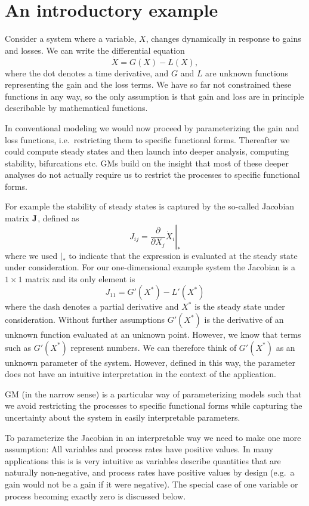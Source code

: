 \documentclass{article}
\newcommand{\eq}[1]{\begin{equation}#1\end{equation}}
\begin{document}

\section{An introductory example}
Consider a system where a variable, $X$, changes dynamically in response to gains and losses. We can write the differential equation 
\eq{
\label{eqGMex}
\dot{X}=G(X)-L(X),
}
where the dot denotes a time derivative, and $G$ and $L$ are unknown functions representing the gain and the loss terms. We have so far not constrained these functions in any way, so the only assumption is that gain and loss are in principle describable by mathematical functions. 

In conventional modeling we would now proceed by parameterizing the gain and loss functions, i.e.~restricting them to specific functional forms. Thereafter we could compute steady states and then launch into deeper analysis, computing stability, bifurcations etc. GMs build on the insight that most of these deeper analyses do not actually require us to restrict the processes to specific functional forms. 

For example the stability of steady states is captured by the so-called Jacobian matrix $\bf J$, defined as 
\eq{
    J_{ij} = \left.\frac{\partial}{\partial X_j} \dot{X}_i \right|_*
}
where we used $|_*$ to indicate that the expression is evaluated at the steady state under consideration. For our one-dimensional example system the Jacobian is a $1\times 1$ matrix and its only element is 
\eq{
J_{11} = G'(X^*)-L'(X^*)
}
where the dash denotes a partial derivative and $X^*$ is the steady state under consideration. Without further assumptions $G'(X^*)$ is the derivative of an unknown function evaluated at an unknown point. However, we know that terms such as $G'(X^*)$ represent numbers. We can therefore think of $G'(X^*)$ as an unknown parameter of the system. However, defined in this way, the parameter does not have an intuitive interpretation in the context of the application.

GM (in the narrow sense) is a particular way of parameterizing models such that we avoid restricting the processes to specific functional forms while capturing the uncertainty about the system in easily interpretable parameters. 

To parameterize the Jacobian in an interpretable way we need to make one more assumption: All variables and process rates have positive values. In many applications this is is very intuitive as variables describe quantities that are naturally non-negative, and process rates have positive values by design (e.g.~a gain would not be a gain if it were negative). The special case of one variable or process becoming exactly zero is discussed below. 
\end{document}
